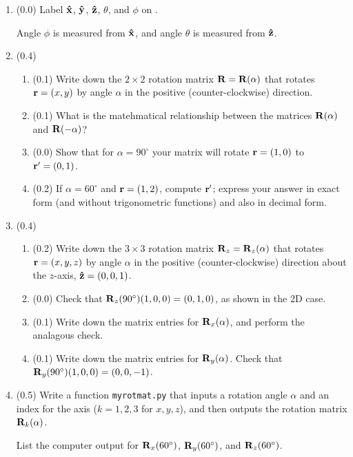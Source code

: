 \documentclass[11pt,titlepage,fleqn]{article}
\newcommand{\rotangA}{\alpha}
\begin{document}
\begin{enumerate}

\item (0.0) Label $\mbox{\boldmath{$\hat{\rm x}$}}$, $\mbox{\boldmath{$\hat{\rm y}$}}$, $\mbox{\boldmath{$\hat{\rm z}$}}$, $\theta$, and $\phi$ on .

Angle $\phi$ is measured from $\mbox{\boldmath{$\hat{\rm x}$}}$, and angle $\theta$ is measured from $\mbox{\boldmath{$\hat{\rm z}$}}$.

\item (0.4) 

\begin{enumerate}
\item (0.1) Write down the $2 \times 2$ rotation matrix $\bR = \bR(\rotangA)$ that rotates $\mbox{${\bf r}$} = (x,y)$ by angle $\rotangA$ in the positive (counter-clockwise) direction.
\item (0.1) What is the matehmatical relationship between the matrices $\bR(\rotangA)$ and $\bR(-\rotangA)$?
\item (0.0) Show that for $\rotangA = 90^\circ$ your matrix will rotate $\mbox{${\bf r}$} = (1,0)$ to $\mbox{${\bf r}$}' = (0,1)$.
\item (0.2) If $\rotangA = 60^\circ$ and $\mbox{${\bf r}$} = (1,2)$, compute $\mbox{${\bf r}$}'$; express your answer in exact form (and without trigonometric functions) and also in decimal form.
\end{enumerate}

\item (0.4)

\begin{enumerate}
\item (0.2) Write down the $3 \times 3$ rotation matrix $\bR_z = \bR_z(\rotangA)$ that rotates $\mbox{${\bf r}$} = (x,y,z)$ by angle $\rotangA$ in the positive (counter-clockwise) direction about the $z$-axis, $\mbox{\boldmath{$\hat{\rm z}$}} = (0,0,1)$.
\item (0.0) Check that $\mbox{${\bf R}$}_z(90^\circ)(1,0,0) = (0,1,0)$, as shown in the 2D case.
\item (0.1) Write down the matrix entries for $\bR_x(\rotangA)$, and perform the analagous check.
\item (0.1) Write down the matrix entries for $\bR_y(\rotangA)$. Check that $\mbox{${\bf R}$}_y(90^\circ)(1,0,0) = (0,0,-1)$.
\end{enumerate}

\item (0.5) Write a function \verb+myrotmat.py+ that inputs a rotation angle $\rotangA$ and an index for the axis ($k = 1,2,3$ for $x,y,z$), and then outputs the rotation matrix $\bR_k(\rotangA)$. 

List the computer output for $\mbox{${\bf R}$}_x(60^\circ)$, $\mbox{${\bf R}$}_y(60^\circ)$, and $\mbox{${\bf R}$}_z(60^\circ)$.


\end{enumerate}
\end{document}

